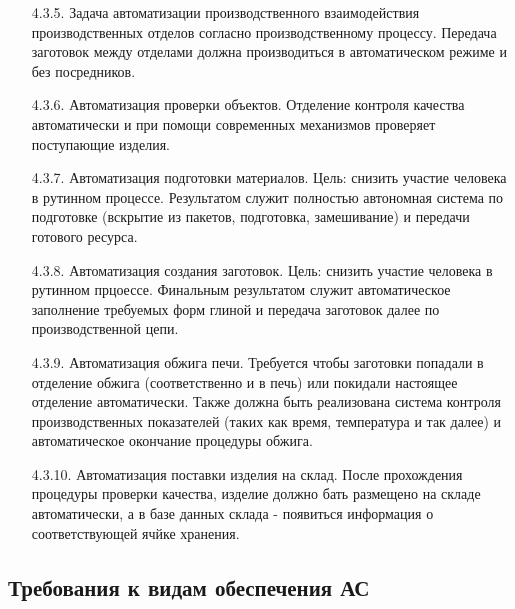 \documentclass[16pt,a4paper]{article}
\begin{document}
\begin{itemize}
    \item [4.3.5.] Задача автоматизации производственного взаимодействия производственных отделов согласно производственному процессу. Передача заготовок между отделами должна производиться в автоматическом режиме и без посредников.
    \item [4.3.6.] Автоматизация проверки объектов. Отделение контроля качества автоматически и при помощи современных механизмов проверяет поступающие изделия.
    \item [4.3.7.] Автоматизация подготовки материалов. Цель: снизить участие человека в рутинном процессе. Результатом служит полностью автономная система по подготовке (вскрытие из пакетов, подготовка, замешивание) и передачи готового ресурса.
    \item [4.3.8.] Автоматизация создания заготовок. Цель: снизить участие человека в рутинном прцоессе. Финальным результатом служит автоматическое заполнение требуемых форм глиной и передача заготовок далее по производственной цепи.
    \item [4.3.9.] Автоматизация обжига печи. Требуется чтобы заготовки попадали в отделение обжига (соответственно и в печь) или покидали настоящее отделение автоматически. Также должна быть реализована система контроля производственных показателей (таких как время, температура и так далее) и автоматическое окончание процедуры обжига. 
    \item [4.3.10.] Автоматизация поставки изделия на склад. После прохождения процедуры проверки качества, изделие должно бать размещено на складе автоматически, а в базе данных склада - появиться информация о соответствующей ячйке хранения.
\end{itemize}
\subsection{Требования к видам обеспечения АС}
\end{document}
